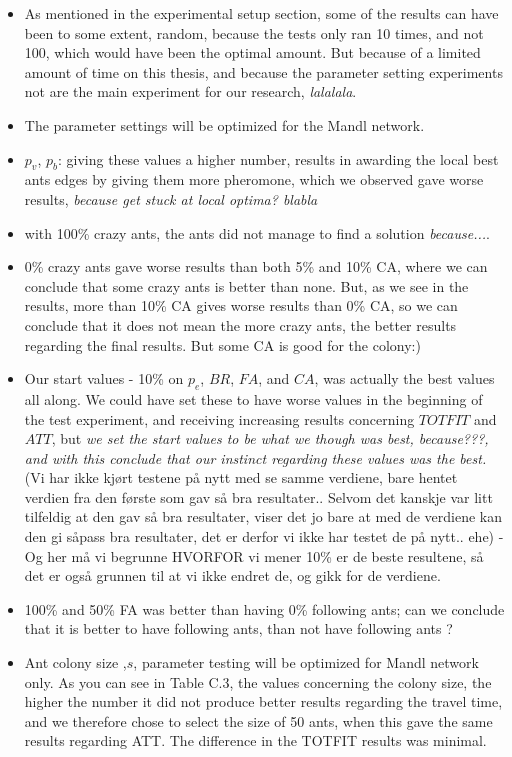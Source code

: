 \begin{itemize}
\item As mentioned in the experimental setup section, some of the results can have been to some extent, random, because the tests only ran 10 times, and not 100, which would have been the optimal amount. But because of a limited amount of time on this thesis, and because the parameter setting experiments not are the main experiment for our research, \emph{\color{red} lalalala}. 
\item The parameter settings will be optimized for the Mandl network.
\item $p_v$, $p_b$: giving these values a higher number, results in awarding the local best ants edges by giving them more pheromone, which we observed gave worse results, \emph{\color{red}because get stuck at local optima? blabla}
\item with 100\% crazy ants, the ants did not manage to find a solution \emph{\color{red}because...}. 
\item 0\% crazy ants gave worse results than both 5\% and 10\% CA, where we can conclude that some crazy ants is better than none. But, as we see in the results, more than 10\% CA gives worse results than 0\% CA, so we can conclude that it does not mean the more crazy ants, the better results regarding the final results. But some CA is good for the colony:)
\item Our start values - 10\% on $p_e$, $BR$, $FA$, and $CA$, was actually the best values all along. We could have set these to have worse values in the beginning of the test experiment, and receiving increasing results concerning $TOTFIT$ and $ATT$, but \emph{\color{red} we set the start values to be what we though was best, because???, and with this conclude that our instinct regarding these values was the best.} (Vi har ikke kjørt testene på nytt med se samme verdiene, bare hentet verdien fra den første som gav så bra resultater.. Selvom det kanskje var litt tilfeldig at den gav så bra resultater, viser det jo bare at med de verdiene kan den gi såpass bra resultater, det er derfor vi ikke har testet de på nytt.. ehe) - Og her må vi begrunne HVORFOR vi mener 10\% er de beste resultene, så det er også grunnen til at vi ikke endret de, og gikk for de verdiene.
\item 100\% and 50\% FA was better than having 0\% following ants; can we conclude that it is better to have following ants, than not have following ants ?
\item Ant colony size ,$s$, parameter testing will be optimized for Mandl network only. As you can see in Table C.3, the values concerning the colony size, the higher the number it did not produce better results regarding the travel time, and we therefore chose to select the size of 50 ants, when this gave the same results regarding ATT. The difference in the TOTFIT results was minimal.
\end{itemize}


